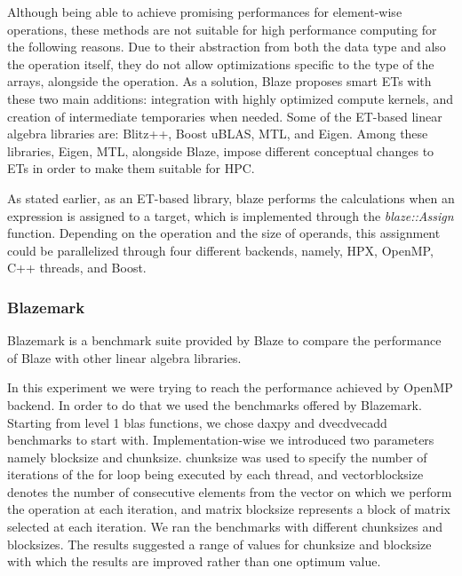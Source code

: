 Although being able to achieve promising performances for element-wise operations, these methods are not suitable for high performance computing for the following reasons. Due to their abstraction from both the data type and also the operation itself, they do not allow optimizations specific to the type of the arrays, alongside the operation\cite{iglberger2012expression}. As a solution, Blaze proposes smart ETs with these two main additions: integration with highly optimized compute kernels, and creation of intermediate temporaries when needed\cite{iglberger2012expression}. 
Some of the ET-based linear algebra libraries are: Blitz++\cite{Blitz}, Boost uBLAS\cite{ublas}, MTL\cite{MTL}, and Eigen\cite{guennebaud2010eigen}. Among these libraries, Eigen, MTL, alongside Blaze, impose different conceptual changes to ETs in order to make them suitable for HPC.    

As stated earlier, as an ET-based library, blaze performs the calculations when an expression is assigned to a target, which is implemented through the \textit{blaze::Assign} function. Depending on the operation and the size of operands, this assignment could be parallelized through four different backends, namely, HPX, OpenMP\cite{dagum1998openmp}, C++ threads, and Boost\cite{Boost}. 



\subsubsection{Blazemark}
Blazemark is a benchmark suite provided by Blaze to compare the performance of Blaze with other linear algebra libraries. 

In this experiment we were trying to reach the performance achieved by OpenMP backend. In order to do that we used the benchmarks offered by Blazemark. Starting from level 1 blas functions, we chose daxpy and dvecdvecadd benchmarks to start with. 
Implementation-wise we introduced two parameters namely block\textunderscore size and chunk\textunderscore size. chunk\textunderscore size was used to specify the number of iterations of the for loop being executed by each thread, and vector\textunderscore block\textunderscore size denotes the number of consecutive elements from the vector on which we perform the operation at each iteration, and matrix \textunderscore block\textunderscore size represents a block of matrix selected at each iteration.
We ran the benchmarks with different chunk\textunderscore sizes and block\textunderscore sizes. The results suggested a range of values for chunk\textunderscore size and block\textunderscore size with which the results are improved rather than one optimum value. 



